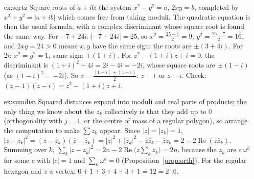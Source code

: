 \begin{solution}{ex:sqrtz}
\idea Square roots of $a+ib$: the system $x^2-y^2=a$, $2xy=b$, completed by $x^2+y^2=|a+ib|$ which comes free from taking moduli. The quadratic equation is then the usual formula, with a complex discriminant whose square root is found the same way.
\writeup For $-7+24i$: $|{-7}+24i|=25$, so $x^2=\frac{25-7}2=9$, $y^2=\frac{25+7}2=16$, and $2xy=24>0$ means $x,y$ have the same sign: the roots are $\pm(3+4i)$. For $2i$: $x^2=y^2=1$, same sign: $\pm(1+i)$.
For $z^2-(1+i)z+i=0$, the discriminant is $(1+i)^2-4i=2i-4i=-2i$, whose square roots are $\pm(1-i)$ (as $(1-i)^2=-2i$). So $z=\frac{(1+i)\pm(1-i)}2$: $z=1$ or $z=i$. Check: $(z-1)(z-i)=z^2-(1+i)z+i$.
\end{solution}

\begin{solution}{ex:sumdist}
\idea Squared distances expand into moduli and real parts of products; the only thing we know about the $z_k$ collectively is that they add up to $0$ (orthogonality with $j=1$, or the centre of mass of a regular polygon), so arrange the computation to make $\sum z_k$ appear.
\writeup Since $|z|=|z_k|=1$, $|z-z_k|^2=(z-z_k)(\bar z-\bar z_k)=|z|^2+|z_k|^2-z\bar z_k-\bar zz_k=2-2\operatorname{Re}(z\bar z_k)$. Summing over $k$,
$\sum_k|z-z_k|^2=2n-2\operatorname{Re}\bigl(z\sum_k\bar z_k\bigr)=2n$, because the $z_k$ are $c\,\omega^k$ for some $c$ with $|c|=1$ and $\sum_k\omega^k=0$ (Proposition~\ref{prop:orth}). For the regular hexagon and $z$ a vertex: $0+1+3+4+3+1=12=2\cdot6$.
\end{solution}

